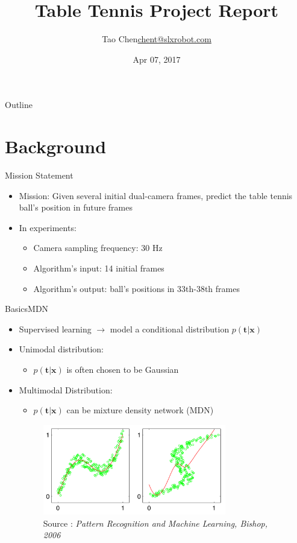 \documentclass{beamer}
\title{Table Tennis Project Report}
\author{Tao Chen\newline\href{mailto:chent@slxrobot.com}{chent@slxrobot.com}}
\institute[Shanghai Lingxian]
{
	Shanghai LingXian Robotics
}
\date{Apr 07, 2017}
\newcommand{\source}[1]{\caption*{{\color{blue}Source :} {#1}} }
\begin{document}
	\begin{frame}
		\titlepage
	\end{frame}
	
	
	\begin{frame}{Outline}
		\tableofcontents
	\end{frame}
    
    
	\section{Background}
	
	\begin{frame}{Mission Statement}
	\begin{itemize}
	\item {{\color{blue}Mission}: Given several {\color{magenta}initial dual-camera frames}, predict the table tennis {\color{magenta}ball's position} in future frames}
	\item {In experiments:}
	\begin{itemize}
	\item {Camera sampling frequency: 30 Hz}
	\item {Algorithm's input: 14 initial frames}
	\item {Algorithm's output: ball's positions in 33th-38th frames}
	\end{itemize}
	\end{itemize}
	\end{frame}
	
	\begin{frame}{Basics}{MDN}
	\begin{itemize}
	\item {Supervised learning $\rightarrow$ model a conditional distribution {\color{magenta} $p(\boldsymbol{t} | \boldsymbol{x})$}}
	\item {{\color{blue} Unimodal distribution}:}
	\begin{itemize}
	\item {$p(\boldsymbol{t} | \boldsymbol{x})$ is often chosen to be {\color{red} Gaussian}}
	\end{itemize}
	\item {{\color{blue} Multimodal Distribution}:}
	\begin{itemize}
	\item {$p(\boldsymbol{t} | \boldsymbol{x})$ can be {\color{red} mixture density network (MDN)}}
	\end{itemize}
	\begin{figure}
	\includegraphics[width=8cm]{mdn_toy.png}
	\caption{Unimodal and Multimodal}
	\source{\textit{Pattern Recognition and Machine Learning, Bishop, 2006}}
	\end{figure}	
	\end{itemize}
	\end{frame}
	
\end{document}
